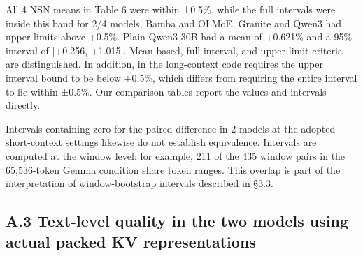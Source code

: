\documentclass[10pt,a4paper]{article}
\begin{document}
All 4 NSN means in Table 6 were within ±0.5\%, while the full intervals were inside this band for 2/4 models, Bamba and OLMoE. Granite and Qwen3 had upper limits above +0.5\%. Plain Qwen3-30B had a mean of +0.621\% and a 95\% interval of {[}+0.256, +1.015{]}. Mean-based, full-interval, and upper-limit criteria are distinguished. In addition, \texttt{} in the long-context code requires the upper interval bound to be below +0.5\%, which differs from requiring the entire interval to lie within ±0.5\%. Our comparison tables report the values and intervals directly.

Intervals containing zero for the paired difference in 2 models at the adopted short-context settings likewise do not establish equivalence. Intervals are computed at the window level: for example, 211 of the 435 window pairs in the 65,536-token Gemma condition share token ranges. This overlap is part of the interpretation of window-bootstrap intervals described in §3.3.

\Needspace{240pt}
\subsection{A.3 Text-level quality in the two models using actual packed KV representations}\label{a.3-text-level-quality-in-the-two-models-using-actual-packed-kv-representations}
\end{document}
